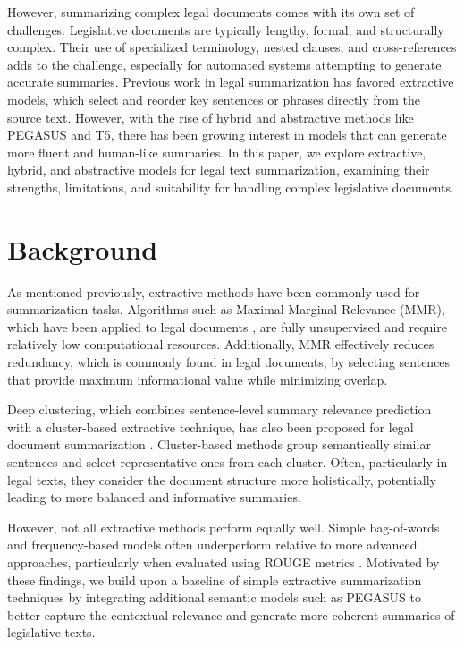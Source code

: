 \documentclass[11pt]{article}
\begin{document}
\indent However, summarizing complex legal documents comes with its own set of challenges. Legislative documents are typically lengthy, formal, and structurally complex. Their use of specialized terminology, nested clauses, and cross-references adds to the challenge, especially for automated systems attempting to generate accurate summaries. Previous work in legal summarization has favored extractive models, which select and reorder key sentences or phrases directly from the source text. However, with the rise of hybrid and abstractive methods like PEGASUS and T5, there has been growing interest in models that can generate more fluent and human-like summaries. In this paper, we explore extractive, hybrid, and abstractive models for legal text summarization, examining their strengths, limitations, and suitability for handling complex legislative documents.


\section{Background}

As mentioned previously, extractive methods have been commonly used for summarization tasks. Algorithms such as Maximal Marginal Relevance (MMR), which have been applied to legal documents \citep{agarwal-etal-2022-extractive}, are fully unsupervised and require relatively low computational resources. Additionally, MMR effectively reduces redundancy, which is commonly found in legal documents, by selecting sentences that provide maximum informational value while minimizing overlap.

\indent Deep clustering, which combines sentence-level summary relevance prediction with a cluster-based extractive technique, has also been proposed for legal document summarization \citep{Jain2024-ht}. Cluster-based methods group semantically similar sentences and select representative ones from each cluster. Often, particularly in legal texts, they consider the document structure more holistically, potentially leading to more balanced and informative summaries.

\indent However, not all extractive methods perform equally well. Simple bag-of-words and frequency-based models often underperform relative to more advanced approaches, particularly when evaluated using ROUGE metrics \citep{9397119}. Motivated by these findings, we build upon a baseline of simple extractive summarization techniques by integrating additional semantic models such as PEGASUS to better capture the contextual relevance and generate more coherent summaries of legislative texts. 
\end{document}
